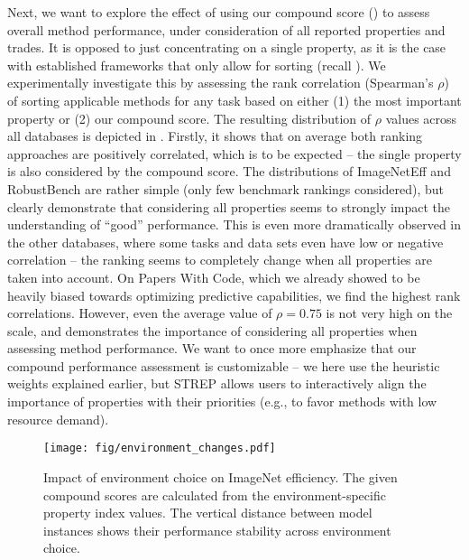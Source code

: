 \documentclass[sn-mathphys,Numbered]{sn-jnl}%
\theoremstyle{thmstylethree}%
\begin{document}
Next, we want to explore the effect of using our compound score () to assess overall method performance, under consideration of all reported properties and trades.
It is opposed to just concentrating on a single property, as it is the case with established frameworks that only allow for sorting (recall ).
We experimentally investigate this by assessing the rank correlation (Spearman's $\rho$) of sorting applicable methods for any task based on either (1) the most important property or (2) our compound score.
The resulting distribution of $\rho$ values across all databases is depicted in .
Firstly, it shows that on average both ranking approaches are positively correlated, which is to be expected -- the single property is also considered by the compound score.
The distributions of ImageNetEff and RobustBench are rather simple (only few benchmark rankings considered), but clearly demonstrate that considering all properties seems to strongly impact the understanding of ``good'' performance.
This is even more dramatically observed in the other databases, where some tasks and data sets even have low or negative correlation -- the ranking seems to completely change when all properties are taken into account.
On Papers With Code, which we already showed to be heavily biased towards optimizing predictive capabilities, we find the highest rank correlations.
However, even the average value of $\rho=0.75$ is not very high on the scale, and demonstrates the importance of considering all properties when assessing method performance.
We want to once more emphasize that our compound performance assessment is customizable -- we here use the heuristic weights explained earlier, but STREP allows users to interactively align the importance of properties with their priorities (e.g., to favor methods with low resource demand).

\begin{figure*}
    \centering
    \texttt{[image: fig/environment\_changes.pdf]}
    \caption{Impact of environment choice on ImageNet efficiency. The given compound scores are calculated from the environment-specific property index values. The vertical distance between model instances shows their performance stability across environment choice. }
    \label{fig:env_changes}
\end{figure*}
\end{document}
